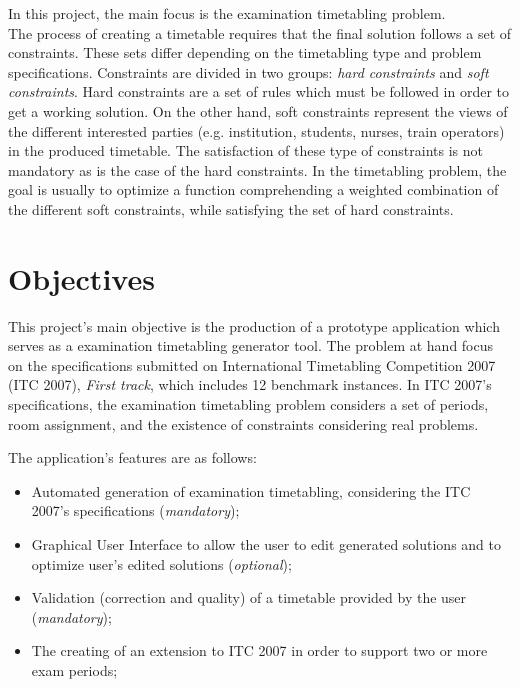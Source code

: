 In this project, the main focus is the examination timetabling problem. \\

The process of creating a timetable requires that the final solution follows a set of constraints. These sets differ depending on the timetabling type and problem specifications. Constraints are divided in two groups: \textit{hard constraints} and \textit{soft constraints}. Hard constraints are a set of rules which must be followed in order to get a working solution. On the other hand, soft constraints represent the views of the different interested parties (e.g. institution, students, nurses, train operators) in the produced timetable. The satisfaction of these type of constraints is not mandatory as is the case of the hard constraints. In the timetabling problem, the goal is usually to optimize a function comprehending a weighted combination of the different soft constraints, while satisfying the set of hard constraints. 

\section{Objectives}

This project's main objective is the production of a prototype application which serves as a examination timetabling generator tool. The problem at hand focus on the specifications submitted on International Timetabling Competition 2007 (ITC 2007), \textit{First track}, which includes 12 benchmark instances. In ITC 2007's specifications, the examination timetabling problem considers a set of periods, room assignment, and the existence of constraints considering real problems.

The application's features are as follows:

\begin{itemize}
	\item Automated generation of examination timetabling, considering the ITC 2007's specifications (\textit{mandatory});
	\item Graphical User Interface to allow the user to edit generated solutions and to optimize user's edited solutions (\textit{optional});
	\item Validation (correction and quality) of a timetable provided by the user (\textit{mandatory});
	\item The creating of an extension to ITC 2007 in order to support two or more exam periods;
\end{itemize}


